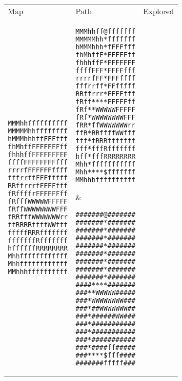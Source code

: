 \documentclass[12pt, article]{scrartcl}
\begin{document}
\begin{tabular}{p{2in} p{2in} p{2in}}
Map & Path & Explored \\

\begin{verbatim}
MMMhhffffffffff
MMMMMhhffffffff
hMMMhhhffFFFfff
fhMhffFFFFFFFff
fhhhffFFFFFFFFF
ffffFFFFFFFFfff
rrrrfFFFFFFffff
fffrrffFFFfffff
RRffrrrfFFFFfff
fRffffrFFFFFFff
fRfffWWWWWFFFFF
fRffWWWWWWWWFFF
fRRfffWWWWWWWrr
ffRRRRffffWWfff
fffffRRRfffffff
fffffffRfffffff
hffffffRRRRRRRR
Mhhffffffffffff
Mhhffffffffffff
MMhhhffffffffff
\end{verbatim}

&

\begin{verbatim}
MMMhhff@fffffff
MMMMMhh*fffffff
hMMMhhh*fFFFfff
fhMhffF*FFFFFff
fhhhffF*FFFFFFF
ffffFFF*FFFFfff
rrrrfFF*FFFffff
fffrrff*FFfffff
RRffrrr*FFFFfff
fRff****FFFFFff
fRf**WWWWWFFFFF
fRf*WWWWWWWWFFF
fRR*ffWWWWWWWrr
ffR*RRffffWWfff
fff*fRRRfffffff
fff*fffRfffffff
hff*fffRRRRRRRR
Mhh*fffffffffff
Mhh****$fffffff
MMhhhffffffffff
\end{verbatim}

&

\begin{verbatim}
#######@#######
#######*#######
#######*#######
#######*#######
#######*#######
#######*#######
#######*#######
#######*#######
#######*#######
####****#######
###**WWWWW#####
###*WWWWWWWW###
###*##WWWWWWW##
###*######WW###
###*###########
###*###########
###*###########
###*####ff#####
###****$fff####
#######fffff###
\end{verbatim}
\end{tabular}
\end{document}
